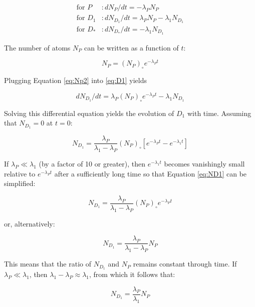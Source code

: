 \documentclass{book}
\begin{document}
\begin{align}
\mbox{for~} P &: dN_P/dt = -\lambda_P N_P \label{eq:P}\\
\mbox{for~} D_1 &: dN_{D_1}/dt = \lambda_P N_P - \lambda_1 N_{D_1} \label{eq:D1}\\
\mbox{for~} D_* &: dN_{D_*}/dt = -\lambda_1 N_{D_1} \label{eq:D*}
\end{align}

The number of atoms $N_P$ can be written as a function of $t$:

\begin{equation}
N_P = (N_P)_\circ e^{-\lambda_P t}
\label{eq:Np2}
\end{equation}

Plugging Equation \ref{eq:Np2} into \ref{eq:D1} yields

\begin{equation}
dN_{D_1}/dt = \lambda_P (N_P)_\circ e^{-\lambda_P t} - \lambda_1 N_{D_1}
\label{eq:ND1dt}
\end{equation}

Solving this differential equation yields the evolution of $D_1$ with
time. Assuming that $N_{D_1}=0$ at $t=0$:

\begin{equation}
N_{D_1} = \frac{\lambda_P}{\lambda_1 - \lambda_P} (N_P)_\circ \left[
  e^{-\lambda_P t} - e^{-\lambda_1 t}\right]
\label{eq:ND1}
\end{equation}

If $\lambda_P \ll \lambda_1$ (by a factor of 10 or greater), then
$e^{-\lambda_1 t}$ becomes vanishingly small relative to
$e^{-\lambda_P t}$ after a sufficiently long time so that Equation
\ref{eq:ND1} can be simplified:

\begin{equation}
N_{D_1} = \frac{\lambda_P}{\lambda_1 - \lambda_P} (N_P)_\circ e^{-\lambda_P t}
\label{eq:ND1b}
\end{equation}

or, alternatively:

\begin{equation}
N_{D_1} = \frac{\lambda_P}{\lambda_1 - \lambda_P} N_P
\label{eq:ND1c}
\end{equation}

This means that the ratio of $N_{D_1}$ and $N_P$ remains constant
through time. If $\lambda_P \ll \lambda_1$, then $\lambda_1 -
\lambda_P \approx \lambda_1$, from which it follows that:

\begin{equation}
N_{D_1} = \frac{\lambda_P}{\lambda_1} N_P
\label{eq:ND1d}
\end{equation}
\end{document}
